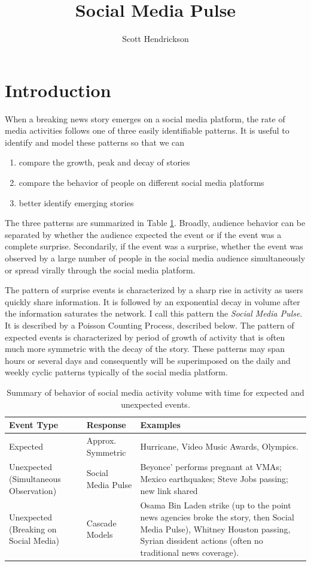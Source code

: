 \documentclass{article}
\title{Social Media Pulse}
\author[]{Scott Hendrickson}
\affil[]{ \Large{Gnip, Inc.} }
\begin{document}
\maketitle

\section{Introduction}

\label{sec:intro}

When a breaking news story emerges on a social media platform, the rate of media activities follows one of three easily identifiable patterns. It is useful to identify and model these patterns so that we can

\begin{enumerate}
\item compare the growth, peak and decay of stories
\item compare the behavior of people on different social media platforms
\item better identify emerging stories
\end{enumerate}

The three patterns are summarized in Table \ref{tab:expect}. Broadly, audience behavior can be separated by whether the audience expected the event or if the event was a complete surprise.  Secondarily, if the event was a surprise, whether the event was observed by a large number of people in the social media audience simultaneously or spread virally through the social media platform.

The pattern of surprise events is characterized by a sharp rise in activity as users quickly share information. It is followed by an exponential decay in volume after the information saturates the network. I call this pattern the \emph{Social Media Pulse}.  It is described by a Poisson Counting Process, described below. The pattern of expected events is characterized by period of growth of activity that is often much more symmetric with the decay of the story.  These patterns may span hours or several days and consequently will be superimposed on the daily and weekly cyclic patterns typically of the social media platform.

\begin{table}
\begin{tabular}{ p{2cm} | p{2cm} | p{4cm} }
\hline
Event Type & Response & Examples \tabularnewline  \hline
Expected    & Approx. Symmetric & Hurricane, Video Music Awards, Olympics. \tabularnewline  \hline
Unexpected (Simultaneous Observation) & Social Media Pulse & Beyonce’ performs pregnant at VMAs; Mexico earthquakes; Steve Jobs passing; new link shared \tabularnewline  \hline
Unexpected (Breaking on Social Media) & Cascade Models & Osama Bin Laden strike (up to the point news agencies broke the story, then Social Media Pulse), Whitney Houston passing, Syrian dissident actions (often no traditional news coverage). \tabularnewline  \hline
\end{tabular}
\caption{Summary of behavior of social media activity volume with time for expected and unexpected events.}
\label{tab:expect}
\end{table}
\end{document}
